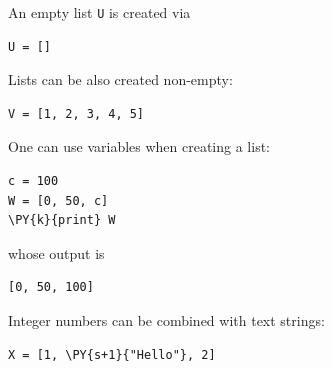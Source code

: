 \noindent
An empty list {\tt U} is created via \\

\begin{bbox}
\begin{Verbatim}[commandchars=\\\{\}]
U = []
\end{Verbatim}
\end{bbox}
\vspace{6mm}

\noindent
Lists can be also created non-empty:\\

\begin{bbox}
\begin{Verbatim}[commandchars=\\\{\}]
V = [1, 2, 3, 4, 5]
\end{Verbatim}
\end{bbox}
\vspace{6mm}

\noindent
One can use variables when creating a list:\\

\begin{bbox}
\begin{Verbatim}[commandchars=\\\{\}]
c = 100
W = [0, 50, c]
\PY{k}{print} W
\end{Verbatim}
\end{bbox}
\vspace{6mm}

\noindent
whose output is \\

\begin{ybox}
\begin{Verbatim}[commandchars=\\\{\}]
[0, 50, 100]
\end{Verbatim}
\end{ybox}
\vspace{6mm}

\noindent
Integer numbers can be combined with text strings:\\

\begin{bbox}
\begin{Verbatim}[commandchars=\\\{\}]
X = [1, \PY{s+1}{"Hello"}, 2]
\end{Verbatim}
\end{bbox}
\vspace{6mm}

